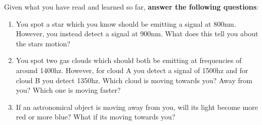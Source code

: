 \begin{steps}
	\item Given what you have read and learned so far, \textbf{answer the following questions}:
	\begin{enumerate}
		\item You spot a star which you know should be emitting a signal at 800nm. However, you instead detect a signal at 900nm. What does this tell you about the stars motion? 
		
		\item You spot two gas clouds which should both be emitting at frequencies of around 1400hz. However, for cloud A you detect a signal of 1500hz and for cloud B you detect 1350hz. Which cloud is moving towards you? Away from you? Which one is moving faster?
		
		\item If an astronomical object is moving away from you, will its light become more red or more blue? What if its moving towards you?
	\end{enumerate}
	
\end{steps}


